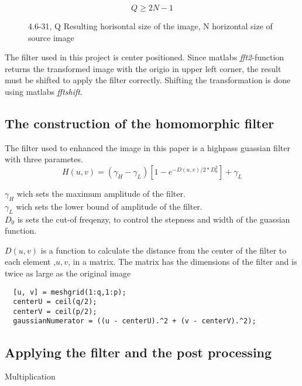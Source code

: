 \begin{figure}
  \begin{equation}
    Q \geq 2N -1
    \label{eqn:Qpadded}
  \end{equation}
  \caption{4.6-31, Q Resulting horisontal size of the image, N horizontal size of source image}
\end{figure}

The filter used in this project is center positioned. Since matlabs \textit{fft2}-function returns the transformed image with the origio in upper left corner, the result must be shifted to apply the filter correctly. Shifting the transformation is done using matlabs \textit{fftshift}.

\subsection{The construction of the homomorphic filter}

The filter used to enhanced the image in this paper is a highpass guassian filter with three parametes. 
    \begin{equation}
    \label{eqn:gaussian_filter}
      H(u,v) = \left( \gamma_H - \gamma_L \right) \left[ 1 - e^{- D(u,v) /2 * D_0^2}\right] + \gamma_L 
    \end{equation}

$\gamma_H$ wich sets the maximum amplitude of the filter.\\
$\gamma_L$ wich sets the lower bound of amplitude of the filter.\\
$D_0$ is sets the cut-of freqenzy, to control the stepness and width of the guassian function.

$D(u,v)$ is a function to calculate the distance from the center of the filter to each element ,$u,v$, in a matrix. The matrix has the dimensions of the filter and is twice as large as the original image
\begin{lstlisting}
  [u, v] = meshgrid(1:q,1:p);
  centerU = ceil(q/2);
  centerV = ceil(p/2);
  gaussianNumerator = ((u - centerU).^2 + (v - centerV).^2);
\end{lstlisting}


\subsection{Applying the filter and the post processing}


Multiplication